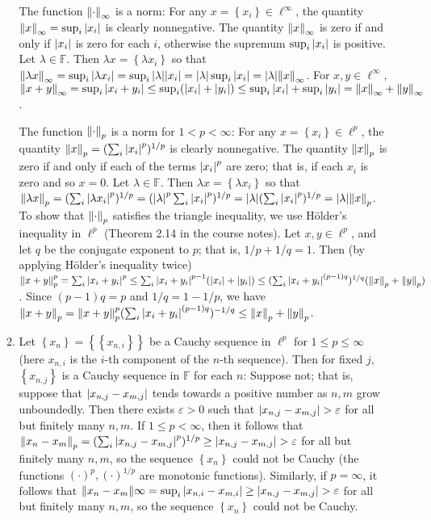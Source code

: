 \documentclass[11pt,leqno]{article}
\theoremstyle{plain}
\theoremstyle{definition}
\numberwithin{equation}{section}
\numberwithin{lem}{section}
\newcommand{\cbr}[1]{\left\{#1\right\}}
\begin{document}
\begin{enumerate}
\begin{enumerate}
    The function $\norm{\cdot}_\infty$ is a norm: For any $x = \cbr{x_i}\in \ell^\infty$, the quantity $\norm{x}_\infty = \sup_i\abs{x_i}$ is clearly nonnegative. The quantity $\norm{x}_\infty$ is zero if and only if $\abs{x_i}$ is zero for each $i$, otherwise the supremum $\sup_i\abs{x_i}$ is positive. Let $\lambda\in \mathbb F$. Then $\lambda x = \cbr{\lambda x_i}$ so that $\norm{\lambda x}_\infty = \sup_i\abs{\lambda x_i} = \sup_i \abs{\lambda}\abs{x_i} = \abs{\lambda}\sup_i\abs{x_i} = \abs{\lambda}\norm{x}_\infty$. For $x,y\in\ell^\infty$, $\norm{x+y}_\infty = \sup_i\abs{x_i+y_i}\leq \sup_i(\abs{x_i} + \abs{y_i}) \leq \sup_i\abs{x_i} + \sup_i\abs{y_i} = \norm{x}_\infty + \norm{y}_\infty$.
    
    The function $\norm{\cdot}_p$ is a norm for $1 < p < \infty$: For any $x = \cbr{x_i}\in \ell^p$, the quantity $\norm{x}_p = (\sum_i \abs{x_i}^p)^{1/p}$ is clearly nonnegative. The quantity $\norm{x}_p$ is zero if and only if each of the terms $\abs{x_i}^p$ are zero; that is, if each $x_i$ is zero and so $x = 0$. Let $\lambda\in \mathbb F$. Then $\lambda x = \cbr{\lambda x_i}$ so that $\norm{\lambda x}_p = (\sum_i \abs{\lambda x_i}^p)^{1/p} = (\abs{\lambda}^p\sum_i \abs{x_i}^p)^{1/p} = \abs{\lambda}(\sum_i \abs{x_i}^p)^{1/p} = \abs{\lambda}\norm{x}_p$. To show that $\norm{\cdot}_p$ satisfies the triangle inequality, we use H\"older's inequality in $\ell^p$ (Theorem 2.14 in the course notes). Let $x,y\in \ell^p$, and let $q$ be the conjugate exponent to $p$; that is, $1/p+ 1/q =1$. Then (by applying H\"older's inequality twice) $\norm{x+y}_p^p = \sum_i\abs{x_i + y_i}^p \leq \sum_i \abs{x_i + y_i}^{p-1}(\abs{x_i} + \abs{y_i}) \leq (\sum_i \abs{x_i + y_i}^{(p-1)q})^{1/q}(\norm{x}_p + \norm{y}_p)$. Since $(p-1)q = p$ and $1/q = 1-1/p$, we have $\norm{x+y}_p = \norm{x+y}_p^p (\sum_i \abs{x_i + y_i}^{(p-1)q})^{-1/q}\leq \norm{x}_p + \norm{y}_p$.
    
    \item Let $\cbr{x_n} = \cbr{\cbr{x_{n,i}}}$ be a Cauchy sequence in $\ell^p$ for $1\leq p \leq \infty$ (here $x_{n,i}$ is the $i$-th component of the $n$-th sequence). Then for fixed $j$, $\cbr{x_{n,j}}$ is a Cauchy sequence in $\mathbb F$ for each $n$: Suppose not; that is, suppose that $\abs{x_{n,j} - x_{m,j}}$ tends towards a positive number as $n,m$ grow unboundedly. Then there exists $\varepsilon>0 $ such that $\abs{x_{n,j} - x_{m,j}} > \varepsilon$ for all but finitely many $n,m$. If $1\leq p < \infty$, then it follows that $\norm{x_n - x_m}_p = (\sum_i\abs{x_{n,j} - x_{m,j}}^p)^{1/p}\geq \abs{x_{n,j} - x_{m,j}} > \varepsilon$ for all but finitely many $n,m$, so the sequence $\cbr{x_n}$ could not be Cauchy (the functions $(\cdot)^p,(\cdot)^{1/p}$ are monotonic functions). Similarly, if $p = \infty$, it follows that $\norm{x_n-x_m}\infty = \sup_i\abs{x_{n,i} - x_{m,i}}\geq \abs{x_{n,j} - x_{m,j}} > \varepsilon$ for all but finitely many $n,m$, so the sequence $\cbr{x_n}$ could not be Cauchy. 
    

\end{enumerate}
\end{enumerate}
\end{document}
